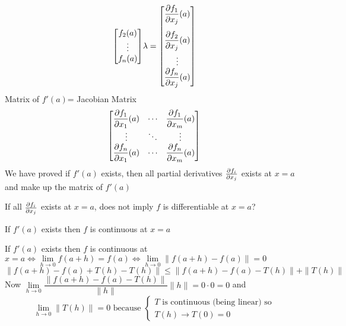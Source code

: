 \begin{myproof}
\begin{align*}
{\begin{bmatrix}
				                                             f_2(a) \\
				                                             \vdots \\
				                                             f_n(a)
			                                             \end{bmatrix}}{\lambda} =\begin{bmatrix}
			                                                                  \dfrac{\partial f_1}{\partial x_j}(a) \\[5mm]
			                                                                  \dfrac{\partial f_2}{\partial x_j}(a) \\[3mm]
			                                                                  \vdots             \\
			                                                                  \dfrac{\partial f_n}{\partial x_j}(a)
		                                                                  \end{bmatrix}
	\end{align*}Matrix of $f'(a)$= Jacobian Matrix $$\begin{bmatrix}
			\dfrac{\partial f_1}{\partial x_1}(a) & \cdots & \dfrac{\partial f_1}{\partial x_m}(a) \\
			\vdots             & \ddots & \vdots             \\
			\dfrac{\partial f_n}{\partial x_1}(a) & \cdots & \dfrac{\partial f_n}{\partial x_m}(a)
		\end{bmatrix}$$We have proved if $f'(a)$ exists, then  all partial derivatives  $\frac{\partial f_i}{\partial x_j}$ exists at $x=a$ and make up the matrix  of $f'(a)$
\end{myproof}
If all $\frac{\partial f_i}{\partial x_j}$ exists at $x=a$, does not imply  $f$ is differentiable at $x=a$?
\begin{Theorem}{}{}
	If $f'(a)$ exists then $f$ is continuous at $x=a$
\end{Theorem}
\begin{myproof}
	If $f'(a)$ exists then $f$ is continuous at $x=a\iff\lim\limits_{h\to 0}f(a+h)=f(a)\iff\lim\limits_{h\to 0}\|f(a+h)-f(a)\|=0$
	$$\|f(a+h)-f(a)+T(h)-T(h)\|\leq \|f(a+h)-f(a)-T(h)\|+\|T(h)\|$$Now $\lim\limits_{h\to 0}\dfrac{\|f(a+h)-f(a)-T(h)\|}{\|h\|}\|h\|=0\cdot 0=0$ and $$\lim_{h\to 0}\|T(h)\|=0\text{ because }\begin{cases*}
			T\text{ is continuous (being linear) so} \\
			T(h)\to T(0)=0
		\end{cases*}$$
\end{myproof}

